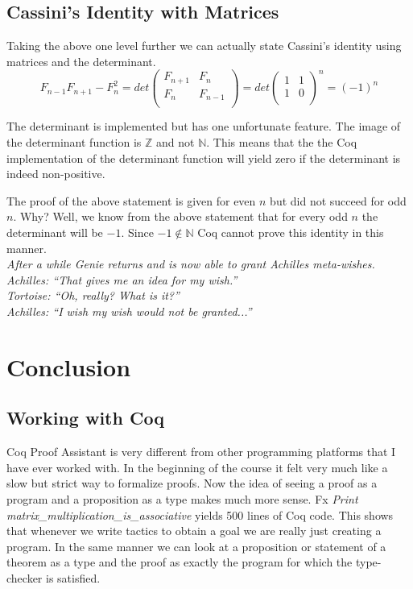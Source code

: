 \documentclass[9pt,a4paper,oneside]{article}
\begin{document}
\subsection{Cassini's Identity with Matrices}

Taking the above one level further we can actually state Cassini's identity using matrices and the determinant.
$$F_{n-1}F_{n+1}-F_n^2= det \begin{pmatrix}
  F_{n+1} & F_n  \\
  F_n & F_{n-1}  \\
 \end{pmatrix}=
det \begin{pmatrix}
  1 & 1  \\
  1 & 0  \\
 \end{pmatrix}^n=(-1)^n
$$

The determinant is implemented but has one unfortunate feature. The image of the determinant function is $\mathbb{Z}$ and 
not $\mathbb{N}$. This means that the the Coq implementation of the determinant function will yield zero if the determinant is indeed non-positive.

The proof of the above statement is given for even $n$ but did not succeed for odd $n$. 
Why? Well, we know from the above statement that for every odd $n$ the determinant will be $-1$. Since $-1\notin \mathbb{N}$ Coq cannot prove this identity in this manner.\\


\noindent \textit{After a while Genie returns and is now able to grant Achilles meta-wishes.\\
Achilles: ``That gives me an idea for my wish.''\\
Tortoise: ``Oh, really? What is it?''\\
Achilles: ``I wish my wish would not be granted...''\\}

\section{Conclusion}

\subsection{Working with Coq}
Coq Proof Assistant is very different from other programming platforms that I have ever worked with. In the beginning of the course it felt very much like a slow but strict way to formalize proofs. Now the idea of seeing a proof as a program and a proposition as a type makes much more sense. Fx \textit{Print matrix\_multiplication\_is\_associative} yields 500 lines of Coq code. This shows that whenever we write tactics to obtain a goal we are really just creating a program. In the same manner we can look at a proposition or statement of a theorem as a type and the proof as exactly the program for which the type-checker is satisfied.
\end{document}
